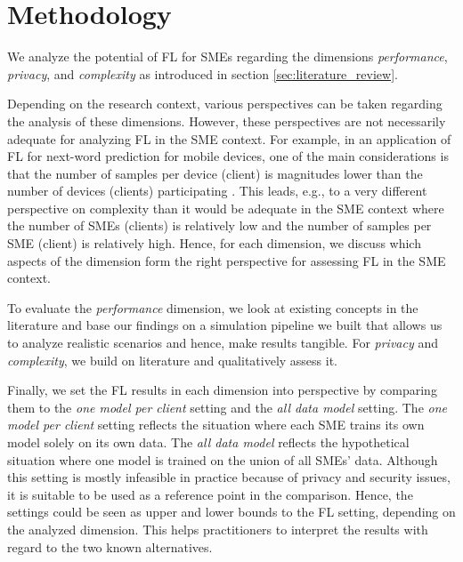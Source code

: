 \section{Methodology\label{sec:methodology}}
We analyze the potential of FL for SMEs regarding the dimensions \emph{performance}, \emph{privacy}, and \emph{complexity} as introduced in section \ref{sec:literature_review}.

Depending on the research context, various perspectives can be taken regarding the analysis of these dimensions. However, these perspectives are not necessarily adequate for analyzing FL in the SME context. For example, in an application of FL for next-word prediction for mobile devices, one of the main considerations is that the number of samples per device (client) is magnitudes lower than the number of devices (clients) participating \citep{mcmahan2017communication}. This leads, e.g., to a very different perspective on complexity than it would be adequate in the SME context where the number of SMEs (clients) is relatively low and the number of samples per SME (client) is relatively high. Hence, for each dimension, we discuss which aspects of the dimension form the right perspective for assessing FL in the SME context. %

To evaluate the \emph{performance} dimension, we look at existing concepts in the literature and base our findings on a simulation pipeline we built that allows us to analyze realistic scenarios and hence, make results tangible. For \emph{privacy} and \emph{complexity}, we build on literature and qualitatively assess it.

Finally, we set the FL results in each dimension into perspective by comparing them to the \emph{one model per client} setting and the \emph{all data model} setting.
The \emph{one model per client} setting reflects the situation where each SME trains its own model solely on its own data. The \emph{all data model} reflects the hypothetical situation where one model is trained on the union of all SMEs' data. Although this setting is  mostly infeasible in practice because of privacy and security issues, it is suitable to be used as a reference point in the comparison. Hence, the settings could be seen as upper and lower bounds to the FL setting, depending on the analyzed dimension. This helps practitioners to interpret the results with regard to the two known alternatives.

